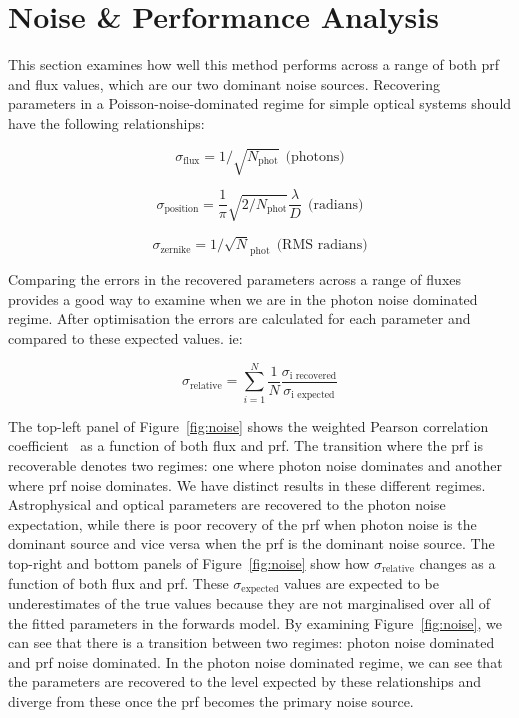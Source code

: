 \documentclass[]{spieman}
\begin{document}


\section{Noise \& Performance Analysis}
\label{sec:noise}

This section examines how well this method performs across a range of both \ac{prf} and flux values, which are our two dominant noise sources. Recovering parameters in a Poisson-noise-dominated regime for simple optical systems should have the following relationships:

$$\sigma_{\text{flux}} = 1/\sqrt{N_\text{phot}} \ \ \text{(photons)}$$

$$\sigma_{\text{position}} = \frac{1}{\pi} \sqrt{2 / N_{\text{phot}}} \frac{\lambda}{D} \ \ \text{(radians)}$$

$$\sigma_{\text{zernike}} = 1 / \sqrt N_{\text{phot}} \ \ \text{(RMS radians)}$$

Comparing the errors in the recovered parameters across a range of fluxes provides a good way to examine when we are in the photon noise dominated regime. After optimisation the errors are calculated for each parameter and compared to these expected values. ie: 

$$\sigma_{\text{relative}} = \sum_{i=1}^{N} \frac{1}{N} \frac{\sigma_{\text{i recovered}}}{\sigma_{\text{i expected}}}$$

The top-left panel of Figure~\ref{fig:noise} shows the weighted Pearson correlation coefficient~\cite{Costa2011} as a function of both flux and \ac{prf}. The transition where the \ac{prf} is recoverable denotes two regimes: one where photon noise dominates and another where \ac{prf} noise dominates. We have distinct results in these different regimes. Astrophysical and optical parameters are recovered to the photon noise expectation, while there is poor recovery of the \ac{prf} when photon noise is the dominant source and vice versa when the \ac{prf} is the dominant noise source. The top-right and bottom panels of Figure~\ref{fig:noise} show how $\sigma_{\text{relative}}$ changes as a function of both flux and \ac{prf}. These $\sigma_{\text{expected}}$ values are expected to be underestimates of the true values because they are not marginalised over all of the fitted parameters in the forwards model. By examining Figure~\ref{fig:noise}, we can see that there is a transition between two regimes: photon noise dominated and \ac{prf} noise dominated. In the photon noise dominated regime, we can see that the parameters are recovered to the level expected by these relationships and diverge from these once the \ac{prf} becomes the primary noise source.
\end{document}
